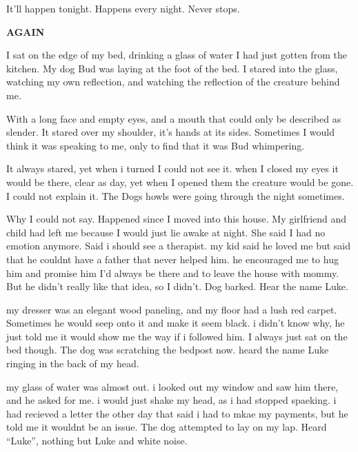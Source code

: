 

It'll happen tonight. Happens every night. Never stops.



{\bf AGAIN}



I sat on the edge of my bed, drinking a glass of water I had just
gotten from the kitchen. My dog Bud was laying at the foot of the
bed. I stared into the glass, watching my own reflection, and
watching the reflection of the creature behind me.



With a long face and empty eyes, and a mouth that could only be
described as slender. It stared over my shoulder, it's hands at its
sides. Sometimes I would think it was speaking to me, only to find
that it was Bud whimpering.



It always stared, yet when i turned I could not see it. when I
closed my eyes it would be there, clear as day, yet when I opened
them the creature would be gone. I could not explain it. The Dogs
howls were going through the night sometimes.



Why I could not say. Happened since I moved into this house. My
girlfriend and child had left me because I would just lie awake at
night. She said I had no emotion anymore. Said i should see a
therapist. my kid said he loved me but said that he couldnt have a
father that never helped him. he encouraged me to hug him and
promise him I'd always be there and to leave the house with mommy.
But he didn't really like that idea, so I didn't. Dog barked. Hear
the name Luke.



my dresser was an elegant wood paneling, and my floor had a lush
red carpet. Sometimes he would seep onto it and make it seem black.
i didn't know why, he just told me it would show me the way if i
followed him. I always just sat on the bed though. The dog was
scratching the bedpost now. heard the name Luke ringing in the back
of my head.



my glass of water was almost out. i looked out my window and saw
him there, and he asked for me. i would just shake my head, as i
had stopped spaeking. i had recieved a letter the other day that
said i had to mkae my payments, but he told me it wouldnt be an
issue. The dog attempted to lay on my lap. Heard ``Luke'', nothing
but Luke and white noise.



